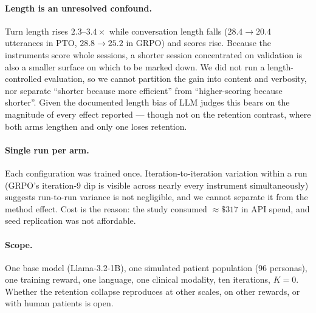 \paragraph{Length is an unresolved confound.} Turn length rises $2.3$--$3.4\times$ while
conversation length falls ($28.4\rightarrow20.4$ utterances in PTO, $28.8\rightarrow25.2$ in
GRPO) and scores rise. Because the instruments score whole sessions, a shorter session
concentrated on validation is also a smaller surface on which to be marked down. We did not run
a length-controlled evaluation, so we cannot partition the gain into content and verbosity, nor
separate ``shorter because more efficient'' from ``higher-scoring because shorter''. Given the
documented length bias of LLM judges \citep{dubois2024lengthcontrolled} this bears on the
magnitude of every effect reported --- though not on the retention contrast, where both arms
lengthen and only one loses retention.

\paragraph{Single run per arm.} Each configuration was trained once. Iteration-to-iteration
variation within a run (GRPO's iteration-9 dip is visible across nearly every instrument
simultaneously) suggests run-to-run variance is not negligible, and we cannot separate it from
the method effect. Cost is the reason: the study consumed ${\approx}\$317$ in API spend, and
seed replication was not affordable.

\paragraph{Scope.} One base model (Llama-3.2-1B), one simulated patient population (96
personas), one training reward, one language, one clinical modality, ten iterations, $K=0$.
Whether the retention collapse reproduces at other scales, on other rewards, or with human
patients is open.
